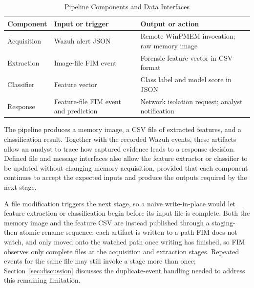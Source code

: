 \documentclass[conference]{IEEEtran}
\begin{document}
\begin{table}[t]
\caption{Pipeline Components and Data Interfaces}
\label{tab:interfaces}
\centering
\footnotesize
\begin{tabular}{@{}p{1.45cm}p{2.85cm}p{3.55cm}@{}}
\toprule
Component & Input or trigger & Output or action \\
\midrule
Acquisition & Wazuh alert JSON & Remote WinPMEM invocation; raw memory image \\
Extraction & Image-file FIM event & Forensic feature vector in CSV format \\
Classifier & Feature vector & Class label and model score in JSON \\
Response & Feature-file FIM event and prediction & Network isolation request; analyst notification \\
\bottomrule
\end{tabular}
\end{table}



The pipeline produces a memory image, a CSV file of extracted features, and a classification result. Together with the recorded Wazuh events, these artifacts allow an analyst to trace how captured evidence leads to a response decision. Defined file and message interfaces also allow the feature extractor or classifier to be updated without changing memory acquisition, provided that each component continues to accept the expected inputs and produce the outputs required by the next stage.

A file modification triggers the next stage, so a naive write-in-place would let feature extraction or classification begin before its input file is complete. Both the memory image and the feature CSV are instead published through a staging-then-atomic-rename sequence: each artifact is written to a path FIM does not watch, and only moved onto the watched path once writing has finished, so FIM observes only complete files at the acquisition and extraction stages. Repeated events for the same file may still invoke a stage more than once; Section~\ref{sec:discussion} discusses the duplicate-event
handling needed to address this remaining limitation.
\end{document}
